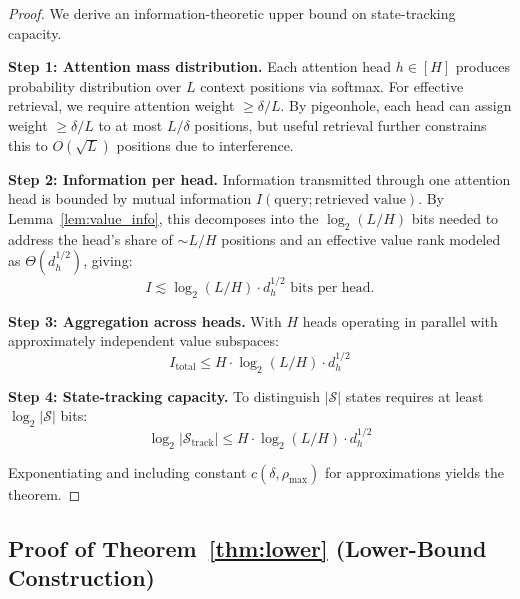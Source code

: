 \documentclass{article}
\theoremstyle{plain}
\theoremstyle{definition}
\theoremstyle{remark}
\begin{document}
\begin{proof}
We derive an information-theoretic upper bound on state-tracking capacity.

\textbf{Step 1: Attention mass distribution.} Each attention head $h \in [H]$ produces probability distribution over $L$ context positions via softmax. For effective retrieval, we require attention weight $\geq \delta/L$. By pigeonhole, each head can assign weight $\geq \delta/L$ to at most $L/\delta$ positions, but useful retrieval further constrains this to $O(\sqrt{L})$ positions due to interference.

\textbf{Step 2: Information per head.} Information transmitted through one attention head is bounded by mutual information $I(\text{query}; \text{retrieved value})$. By Lemma~\ref{lem:value_info}, this decomposes into the $\log_2(L/H)$ bits needed to address the head's share of $\sim L/H$ positions and an effective value rank modeled as $\Theta(d_h^{1/2})$, giving:
\begin{equation}
I \lesssim \log_2(L/H) \cdot d_h^{1/2} \text{ bits per head.}
\end{equation}

\textbf{Step 3: Aggregation across heads.} With $H$ heads operating in parallel with approximately independent value subspaces:
\begin{equation}
I_{\text{total}} \leq H \cdot \log_2(L/H) \cdot d_h^{1/2}
\end{equation}

\textbf{Step 4: State-tracking capacity.} To distinguish $|\mathcal{S}|$ states requires at least $\log_2 |\mathcal{S}|$ bits:
\begin{equation}
\log_2 |\mathcal{S}_{\text{track}}| \leq H \cdot \log_2(L/H) \cdot d_h^{1/2}
\end{equation}

Exponentiating and including constant $c(\delta, \rho_{\max})$ for approximations yields the theorem.
\end{proof}

\subsection{Proof of Theorem~\ref{thm:lower} (Lower-Bound Construction)}
\end{document}
